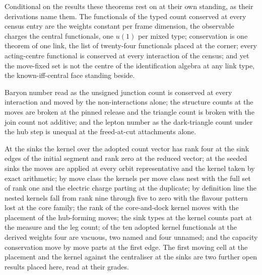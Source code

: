 \begin{chconditional}\label{box:IV-6-conservation-as-the-kernel-of-the-move-matrix:3}
Conditional on the results these theorems rest on at their own standing, as their derivations name them.
The functionals of the typed count conserved at every census entry are the weights constant per frame dimension, the observable charges the central functionals, one $u(1)$ per mixed type; conservation is one theorem of one link, the list of twenty-four functionals placed at the corner; every acting-centre functional is conserved at every interaction of the census; and yet the move-fixed set is not the centre of the identification algebra at any link type, the known-iff-central face standing beside.
\end{chconditional}
\begin{chtheorem}\label{box:IV-6-conservation-as-the-kernel-of-the-move-matrix:4}
Baryon number read as the unsigned junction count is conserved at every interaction and moved by the non-interactions alone; the structure counts at the moves are broken at the pinned release and the triangle count is broken with the join count not additive; and the lepton number as the dark-triangle count under the hub step is unequal at the freed-at-cut attachments alone.
\end{chtheorem}
\begin{chwall}\label{box:IV-6-conservation-as-the-kernel-of-the-move-matrix:5}
At the sinks the kernel over the adopted count vector has rank four at the sink edges of the initial segment and rank zero at the reduced vector; at the seeded sinks the moves are applied at every orbit representative and the kernel taken by exact arithmetic; by move class the kernels per move class nest with the full set of rank one and the electric charge parting at the duplicate; by definition line the nested kernels fall from rank nine through five to zero with the flavour pattern lost at the core family; the rank of the core-and-dock kernel moves with the placement of the hub-forming moves; the sink types at the kernel counts part at the measure and the leg count; of the ten adopted kernel functionals at the derived weights four are vacuous, two named and four unnamed; and the capacity conservation move by move parts at the first edge. The first moving cell at the placement and the kernel against the centraliser at the sinks are two further open results placed here, read at their grades.
\end{chwall}
